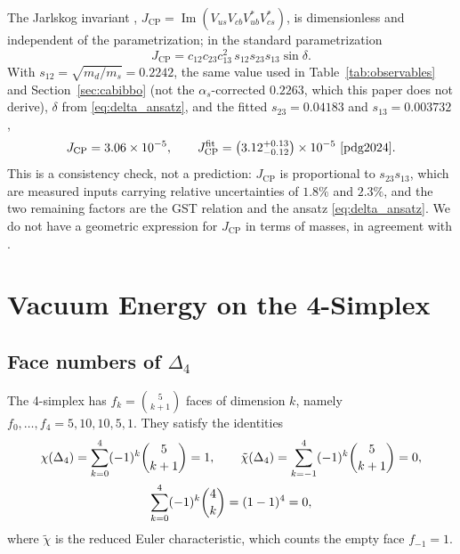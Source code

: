 \documentclass[11pt,reqno]{amsart}
\theoremstyle{definition}
\begin{document}
The Jarlskog invariant \cite{jarlskog1985commutator}, $J_{\mathrm{CP}} = \operatorname{Im}(V_{us}V_{cb}V_{ub}^*V_{cs}^*)$, is dimensionless and independent of the parametrization; in the standard parametrization
\begin{equation}
    J_{\mathrm{CP}} = c_{12} c_{23} c_{13}^2 \, s_{12} s_{23} s_{13} \sin\delta.
\end{equation}
With $s_{12} = \sqrt{m_d/m_s} = 0.2242$, the same value used in Table~\ref{tab:observables} and Section~\ref{sec:cabibbo} (not the $\alpha_s$-corrected $0.2263$, which this paper does not derive), $\delta$ from \eqref{eq:delta_ansatz}, and the fitted $s_{23} = 0.04183$ and $s_{13} = 0.003732$ \cite{pdg2024},
\begin{equation}
    J_{\mathrm{CP}} = 3.06 \times 10^{-5}, \qquad J_{\mathrm{CP}}^{\mathrm{fit}} = \left(3.12^{+0.13}_{-0.12}\right) \times 10^{-5} \ \text{\cite{pdg2024}}.
\end{equation}
This is a consistency check, not a prediction: $J_{\mathrm{CP}}$ is proportional to $s_{23}s_{13}$, which are measured inputs carrying relative uncertainties of $1.8\%$ and $2.3\%$, and the two remaining factors are the GST relation and the ansatz \eqref{eq:delta_ansatz}. We do not have a geometric expression for $J_{\mathrm{CP}}$ in terms of masses, in agreement with \cite[Ch.~12, Sec.~7]{silvafilho2026book}.

\section{Vacuum Energy on the 4-Simplex}\label{sec:cc}

\subsection{Face numbers of \texorpdfstring{$\Delta_4$}{Delta 4}}
The 4-simplex has $f_k = \binom{5}{k+1}$ faces of dimension $k$, namely $f_0, \dots, f_4 = 5, 10, 10, 5, 1$. They satisfy the identities
\begin{gather}\label{eq:euler}
    \chi(\Delta_4) = \sum_{k=0}^{4} (-1)^k \binom{5}{k+1} = 1, \qquad
    \tilde\chi(\Delta_4) = \sum_{k=-1}^{4} (-1)^k \binom{5}{k+1} = 0, \\
    \sum_{k=0}^{4} (-1)^k \binom{4}{k} = (1-1)^4 = 0, \notag
\end{gather}
where $\tilde\chi$ is the reduced Euler characteristic, which counts the empty face $f_{-1} = 1$.
\end{document}
